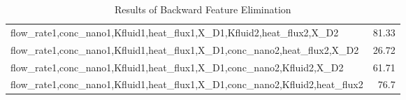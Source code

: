\begin{table*}
\begin{tabular}{lr}
 flow\_rate1,conc\_nano1,Kfluid1,heat\_flux1,X\_D1,Kfluid2,heat\_flux2,X\_D2                         & 81.33 \\
 flow\_rate1,conc\_nano1,Kfluid1,heat\_flux1,X\_D1,conc\_nano2,heat\_flux2,X\_D2                     & 26.72 \\
 flow\_rate1,conc\_nano1,Kfluid1,heat\_flux1,X\_D1,conc\_nano2,Kfluid2,X\_D2                         & 61.71 \\
 flow\_rate1,conc\_nano1,Kfluid1,heat\_flux1,X\_D1,conc\_nano2,Kfluid2,heat\_flux2                   & 76.7  \\
\hline
\end{tabular}
        \caption{Results of Backward Feature Elimination}
        \label{backward}
    \end{table*}
    
